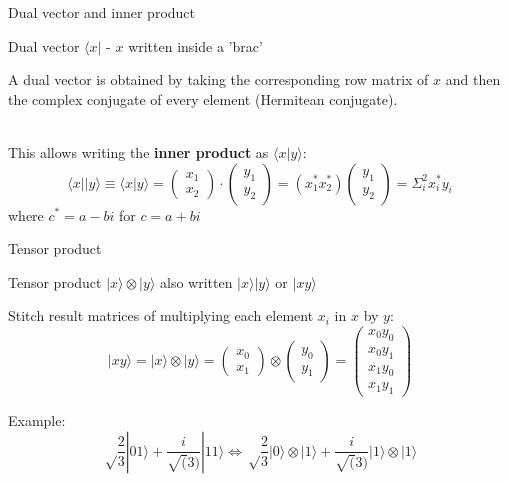 \documentclass[svgnames,smaller,aspectratio=169]{beamer}
\begin{document}
\begin{frame}[fragile]{Dual vector and inner product}
    \begin{block}{Dual vector}
       $\langle x |$ - $x$ written inside a 'brac'
    \end{block}
  A dual vector is obtained by taking the corresponding row matrix of $x$ and then the complex conjugate of every
  element (Hermitean conjugate). \\~\

  This allows writing the \textbf{inner product} as $\langle x | y \rangle$:
  \begin{equation*}
    \langle x || y \rangle \equiv \langle x | y \rangle = \begin{pmatrix} x_1 \\ x_2 \end{pmatrix}
    \cdot \begin{pmatrix} y_1 \\ y_2 \end{pmatrix} = (x_1^* x_2^*)\begin{pmatrix} y_1 \\ y_2 \end{pmatrix} =
    \Sigma_i^2x_i^* y_i
  \end{equation*}
   where $c^*=a-bi$  for $c=a+bi$
\end{frame}



\begin{frame}[fragile]{Tensor product}
  \begin{block}{Tensor product}
   $|x\rangle\otimes|y\rangle$ also written $|x\rangle|y\rangle$ or $|xy\rangle$
  \end{block}
  Stitch result matrices of multiplying each element $x_i$ in $x$ by $y$:
$$|xy\rangle = |x\rangle\otimes|y\rangle = \begin{pmatrix} x_0 \\ x_1 \end{pmatrix} \otimes \begin{pmatrix} y_0 \\ y_1 \end{pmatrix}
  = \begin{pmatrix} x_0 y_0 \\ x_0 y_1 \\ x_1 y_0 \\ x_1 y_1 \end{pmatrix}$$
  
Example: $$\sqrt\frac{2}{3}|01\rangle + \frac{i}{\sqrt(3)}|11\rangle \Longleftrightarrow
\sqrt\frac{2}{3}|0\rangle\otimes|1\rangle + \frac{i}{\sqrt(3)}|1\rangle\otimes|1\rangle$$ \\~\

\textbf{}
\end{frame}
\end{document}
